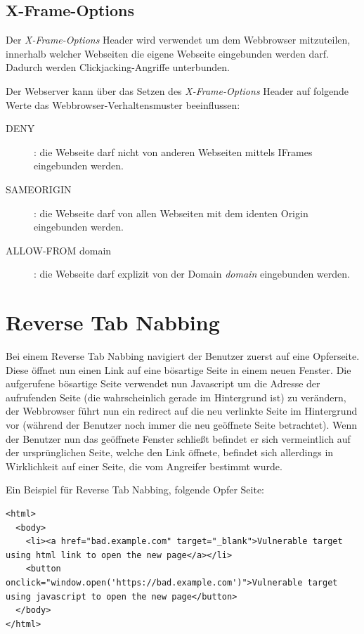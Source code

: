 \subsection{X-Frame-Options}
\label{x_frame_options}

Der \textit{X-Frame-Options} Header wird verwendet um dem Webbrowser mitzuteilen, innerhalb welcher Webseiten die eigene Webseite eingebunden werden darf. Dadurch werden Clickjacking-Angriffe unterbunden.

Der Webserver kann über das Setzen des \textit{X-Frame-Options} Header auf folgende Werte das Webbrowser-Verhaltensmuster beeinflussen:

\begin{description}
	\item[DENY]: die Webseite darf nicht von anderen Webseiten mittels IFrames eingebunden werden.
	\item[SAMEORIGIN]: die Webseite darf von allen Webseiten mit dem identen Origin eingebunden werden.
	\item[ALLOW-FROM domain]: die Webseite darf explizit von der Domain \textit{domain} eingebunden werden.
\end{description}

\section{Reverse Tab Nabbing}

Bei einem Reverse Tab Nabbing navigiert der Benutzer zuerst auf eine Opferseite. Diese öffnet nun einen Link auf eine bösartige Seite in einem neuen Fenster. Die aufgerufene bösartige Seite verwendet nun Javascript um die Adresse der aufrufenden Seite (die wahrscheinlich gerade im Hintergrund ist) zu verändern, der Webbrowser führt nun ein redirect auf die neu verlinkte Seite im Hintergrund vor (während der Benutzer noch immer die neu geöffnete Seite betrachtet). Wenn der Benutzer nun das geöffnete Fenster schließt befindet er sich vermeintlich auf der ursprünglichen Seite, welche den Link öffnete, befindet sich allerdings in Wirklichkeit auf einer Seite, die vom Angreifer bestimmt wurde.

Ein Beispiel für Reverse Tab Nabbing, folgende Opfer Seite:

\begin{verbatim}
<html>
  <body>
    <li><a href="bad.example.com" target="_blank">Vulnerable target using html link to open the new page</a></li>
    <button onclick="window.open('https://bad.example.com')">Vulnerable target using javascript to open the new page</button>
  </body>
</html>
\end{verbatim}

